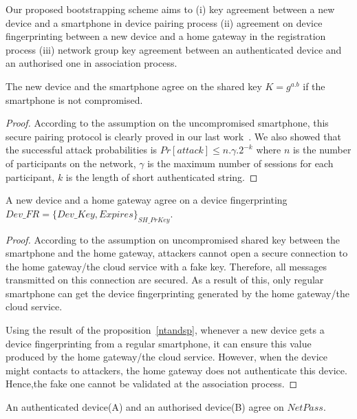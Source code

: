 Our proposed bootstrapping scheme aims to (i) key agreement between a new device and a smartphone in device pairing process (ii) agreement on device fingerprinting between a new device and a home gateway in the registration process (iii) network group key agreement between an authenticated device and an authorised one in association process. 

\begin{Proposition}\label{ntandsp}
The new device and the smartphone agree on the shared key $K= g^{a.b}$ if the smartphone is not compromised. 
\end{Proposition}

\begin{proof}

According to the assumption on the uncompromised smartphone, this secure pairing protocol is clearly proved in our last work~\cite{7158026}. We also showed that the successful attack probabilities is $Pr[attack] \leq n.\gamma.2^{-k}$ where $n$ is the number of participants on the network, $\gamma$ is the maximum number of sessions for each participant, $k$ is the length of short authenticated string.
\end{proof}

\begin{Proposition}\label{newandsh}
A new device and a home gateway agree on a device fingerprinting $Dev\_FR = \{Dev\_Key, Expires\}_{SH\_PrKey}$. 
\end{Proposition}

\begin{proof}

According to the assumption on uncompromised shared key between the smartphone and the home gateway, attackers cannot open a secure connection to the home gateway/the cloud service with a fake key. Therefore, all messages transmitted on this connection are secured. As a result of this, only regular smartphone can get the device fingerprinting generated by the home gateway/the cloud service. 

Using the result of the proposition~\ref{ntandsp}, whenever a new device gets a device fingerprinting from a regular smartphone, it can ensure this value produced by the home gateway/the cloud service. However, when the device might contacts to attackers, the home gateway does not authenticate this device. Hence,the fake one cannot be validated at the association process. 

\end{proof}

\begin{Proposition}
An authenticated device(A) and an authorised device(B) agree on $NetPass$. 
\end{Proposition}

